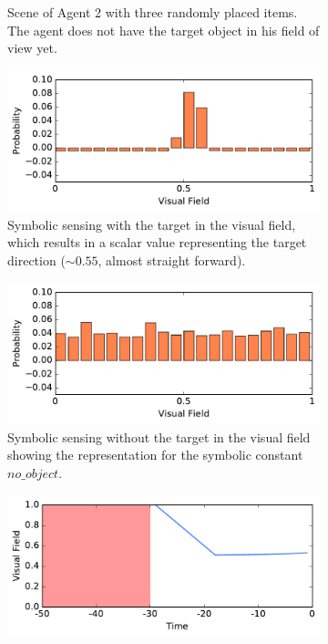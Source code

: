 \documentclass[journal]{journal}
\begin{document}
\begin{figure}
\begin{subfigure}{.47\columnwidth}
{	}%
	\caption{Scene of Agent 2 with three randomly placed items.
	The agent does not have the target object in his field of view yet.}
	\label{fig:experiment:agent2}
\end{subfigure}
\begin{subfigure}{.49\columnwidth}
	\center
	\includegraphics[width=.98\columnwidth]{img/3_139.pdf}
	\caption{Symbolic sensing with the target in the visual field, which results in a scalar
	value representing the target direction (${\sim}0.55$, almost straight
	forward).}
	\label{fig:experiment:sensor1}
\end{subfigure}
\begin{subfigure}{.49\columnwidth}
	\center
	\includegraphics[width=.98\columnwidth]{img/3_235.pdf}
	\caption{Symbolic sensing without the target in the visual field showing the
	representation for the symbolic constant $no\_object$.\\}
	\label{fig:experiment:sensor2}
\end{subfigure}
\begin{subfigure}{.49\columnwidth}
	\center
	\includegraphics[width=.98\columnwidth]{img/1_139.pdf}

\end{subfigure}
\end{figure}
\end{document}
